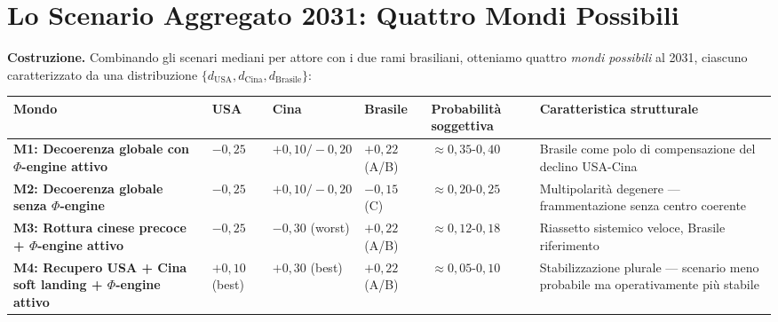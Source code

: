\section{Lo Scenario Aggregato 2031: Quattro Mondi
Possibili}\label{lo-scenario-aggregato-2031-quattro-mondi-possibili}

\Hypoth{} \textbf{Costruzione.} Combinando gli scenari mediani per
attore con i due rami brasiliani, otteniamo quattro \emph{mondi
possibili} al 2031, ciascuno caratterizzato da una distribuzione
\(\{d_{\text{USA}}, d_{\text{Cina}}, d_{\text{Brasile}}\}\):

{\def\LTcaptype{none} %
{\small\begin{longtable}[]{@{}
  >{\raggedright\arraybackslash}p{}
  >{\raggedright\arraybackslash}p{}
  >{\raggedright\arraybackslash}p{}
  >{\raggedright\arraybackslash}p{}
  >{\raggedright\arraybackslash}p{}
  >{\raggedright\arraybackslash}p{}@{}}
\toprule\noalign{}
\begin{minipage}[b]{\linewidth}\raggedright
Mondo
\end{minipage} & \begin{minipage}[b]{\linewidth}\raggedright
USA
\end{minipage} & \begin{minipage}[b]{\linewidth}\raggedright
Cina
\end{minipage} & \begin{minipage}[b]{\linewidth}\raggedright
Brasile
\end{minipage} & \begin{minipage}[b]{\linewidth}\raggedright
Probabilità soggettiva
\end{minipage} & \begin{minipage}[b]{\linewidth}\raggedright
Caratteristica strutturale
\end{minipage} \\
\midrule\noalign{}
\endhead
\bottomrule\noalign{}
\endlastfoot
\textbf{M1: Decoerenza globale con \(\Phi\)-engine attivo} & \(-0{,}25\)
& \(+0{,}10/-0{,}20\) & \(+0{,}22\) (A/B) &
\(\approx 0{,}35\)-\(0{,}40\) & Brasile come polo di compensazione del
declino USA-Cina \\
\textbf{M2: Decoerenza globale senza \(\Phi\)-engine} & \(-0{,}25\) &
\(+0{,}10/-0{,}20\) & \(-0{,}15\) (C) & \(\approx 0{,}20\)-\(0{,}25\) &
Multipolarità degenere --- frammentazione senza centro coerente \\
\textbf{M3: Rottura cinese precoce + \(\Phi\)-engine attivo} &
\(-0{,}25\) & \(-0{,}30\) (worst) & \(+0{,}22\) (A/B) &
\(\approx 0{,}12\)-\(0{,}18\) & Riassetto sistemico veloce, Brasile
riferimento \\
\textbf{M4: Recupero USA + Cina soft landing + \(\Phi\)-engine attivo} &
\(+0{,}10\) (best) & \(+0{,}30\) (best) & \(+0{,}22\) (A/B) &
\(\approx 0{,}05\)-\(0{,}10\) & Stabilizzazione plurale --- scenario
meno probabile ma operativamente più stabile \\
\end{longtable}}
}

